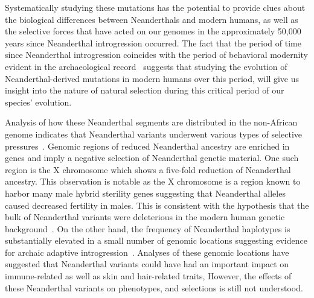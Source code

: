 Systematically studying these mutations has the potential to provide clues about the biological differences between Neanderthals and modern humans, as well as the selective forces that have acted on our genomes in the approximately 50,000 years since Neanderthal introgression occurred. The fact that the period of time since Neanderthal introgression coincides with the period of behavioral modernity evident in the archaeological record~\cite{klein2002dawn} suggests that studying the evolution of Neanderthal-derived mutations in modern humans over this period, will give us insight into the nature of natural selection during this critical period of our species' evolution. 

Analysis of how these Neanderthal segments are distributed in the non-African genome indicates that Neanderthal variants underwent various types of selective pressures~\cite{sankararaman2014genomic,vernot2014resurrecting}. Genomic regions of reduced Neanderthal ancestry are enriched in genes and imply a negative selection of Neanderthal genetic material. One such region is the X chromosome which shows a five-fold reduction of Neanderthal ancestry. This observation is notable as the X chromosome is a region known to harbor many male hybrid sterility genes suggesting that Neanderthal alleles caused decreased fertility in males. This is consistent with the hypothesis that the bulk of Neanderthal variants were deleterious in the modern human genetic background~\cite{sankararaman2014genomic,vernot2014resurrecting}. 
On the other hand, the frequency of Neanderthal haplotypes is substantially elevated in a small number of genomic locations suggesting evidence for archaic adaptive introgression~\cite{sankararaman2014genomic,vernot2014resurrecting,sankararaman2016combined,vernot2016excavating,racimo2015evidence}. Analyses of these genomic locations have suggested that Neanderthal variants could have had an important impact on immune-related as well as skin and hair-related traits, However, the effects of these Neanderthal variants on phenotypes, and selections is still not understood.
